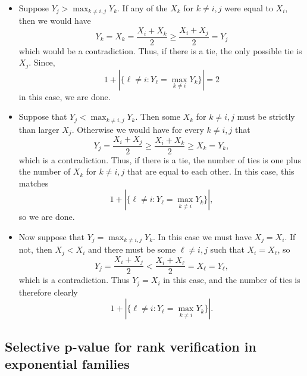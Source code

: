 \documentclass{article}
\begin{document}
\begin{appendix}
\begin{itemize}
    \item Suppose $Y_j > \max_{k \neq i, j} Y_k$. If any of the $X_k$ for $k \neq i, j$ were equal to $X_i$, then we would have 
    \begin{equation*}
       Y_k = X_k =  \frac{X_i + X_k }{2} \geq \frac{X_i + X_j}{2} = Y_j
    \end{equation*}
    which would be a contradiction. Thus, if there is a tie, the only possible tie is $X_j$. Since, 
    \begin{equation*}
        1 + |\{ \ell \neq i : Y_{\ell} = \max_{k \neq i} Y_k  \}| = 2
    \end{equation*}
    in this case, we are done. 
    \item Suppose that $Y_j < \max_{k \neq i, j} Y_k$. Then some $X_k$ for $k \neq i, j$ must be strictly than larger $X_j$. Otherwise we would have for every $k \neq i, j$ that  
    \begin{equation*}
        Y_j = \frac{X_i + X_j}{2} \geq  \frac{X_i + X_k}{2} \geq X_k = Y_k,
    \end{equation*}
     which is a contradiction. Thus, if there is a tie, the number of ties is one plus the number of $X_k$ for $k \neq i, j$ that are equal to each other. In this case, this matches
    \begin{equation*}
        1 + |\{ \ell \neq i : Y_{\ell} = \max_{k \neq i} Y_k  \}|,
    \end{equation*}
    so we are done.
    \item Now suppose that $Y_j = \max_{k \neq i, j} Y_k$. In this case we must have $X_j = X_i$. If not, then $X_j < X_i$ and  there must be some $\ell \neq i, j$ such that $X_i = X_{\ell}$, so 
    \begin{equation*}
        Y_j =  \frac{X_i + X_j}{2} < \frac{X_i + X_{\ell}}{2} = X_{\ell} = Y_{\ell},
    \end{equation*}
    which is a contradiction. Thus $Y_j = X_i$ in this case, and the number of ties is therefore clearly 
    \begin{equation*}
        1 + |\{ \ell \neq i : Y_{\ell} = \max_{k \neq i} Y_k  \}|.
    \end{equation*}
\end{itemize}

\subsection{Selective p-value for rank verification in exponential families}
\label{sec:rank_verficiation_adj_appdx}


\end{appendix}
\end{document}
